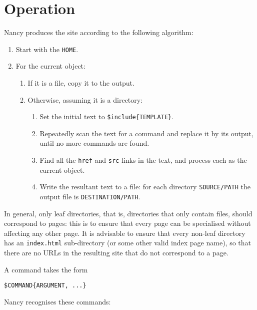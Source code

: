 \documentclass[english]{scrartcl}
\begin{document}
\section{Operation}
\label{operation}

Nancy produces the site according to the following algorithm:

\begin{enumerate}
\item Start with the \verb|HOME|.
\item For the current object:
\begin{enumerate}
\item If it is a file, copy it to the output.
\item Otherwise, assuming it is a directory:
\begin{enumerate}
\item Set the initial text to \verb|$include{TEMPLATE}|.
\item Repeatedly scan the text for a command and replace it by its output, until no more commands are found.
\item Find all the \verb|href| and \verb|src| links in the text, and process each as the current object.
\item Write the resultant text to a file: for each directory \verb|SOURCE/PATH| the output file is \verb|DESTINATION/PATH|.
\end{enumerate}
\end{enumerate}
\end{enumerate}

In general, only leaf directories, that is, directories that only contain files, should correspond to pages: this is to ensure that every page can be specialised without affecting any other page. It is advisable to ensure that every non-leaf directory has an \verb|index.html| sub-directory (or some other valid index page name), so that there are no URLs in the resulting site that do not correspond to a page.

A command takes the form

\begin{verbatim}
$COMMAND{ARGUMENT, ...}
\end{verbatim}

Nancy recognises these commands:
\end{document}
